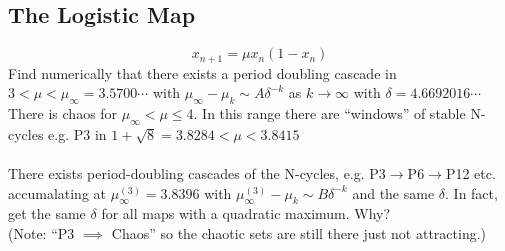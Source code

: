 \documentclass{article}
\begin{document}
\subsection{The Logistic Map}
\[ x_{n+1} = \mu x_n ( 1- x_n) \]
Find numerically that there exists a period doubling cascade in 
$3<\mu<\mu_{\infty} =3.5700\cdots$ with $\mu_{\infty}-\mu_k \sim A \delta^{-k}$
as $k \to \infty$ with $\delta = 4.6692016\cdots$ There is chaos for 
$\mu_{\infty} < \mu \leq 4$. In this range there are ``windows'' of stable
N-cycles e.g. P3 in $1+\sqrt{8}=3.8284<\mu < 3.8415$
\\
\\
There exists period-doubling cascades of the N-cycles, e.g. P3$\to$P6$\to$P12 
etc. accumalating at $\mu_{\infty}^{(3)} = 3.8396$ with 
$\mu_{\infty}^{(3)}-\mu_k \sim B \delta^{-k}$ and the same $\delta$.
In fact, get the same $\delta$ for all maps with a quadratic maximum. Why?
\\
(Note: ``P3 $\implies$ Chaos'' so the chaotic sets are still there just not 
attracting.)
\end{document}
